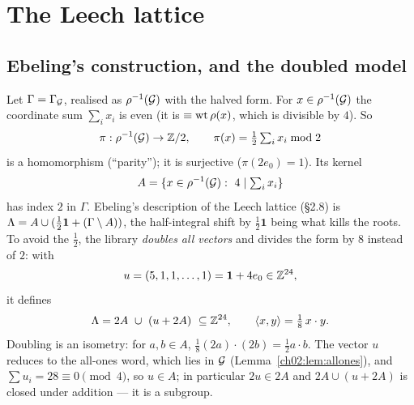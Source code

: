 \section{The Leech lattice}\label{ch02:sec:leech}

\subsection{Ebeling's construction, and the doubled model}

Let $\Gamma=\Gamma_{\mathcal{G}}$, realised as $\rho^{-1}(\mathcal{G})$ with the halved form.  For
$x\in\rho^{-1}(\mathcal{G})$ the coordinate sum $\sum_ix_i$ is even (it is $\equiv\operatorname{wt}\rho(x)$,
which is divisible by $4$).  So
\begin{equation*}
\pi:\rho^{-1}(\mathcal{G})\to{\mathbb{Z}}/2,\qquad \pi(x)=\tfrac12\textstyle\sum_ix_i\bmod2
\end{equation*}
is a homomorphism (``parity''); it is surjective ($\pi(2e_0)=1$).  Its kernel
\begin{equation*}
A=\{x\in\rho^{-1}(\chtwoG):\ 4\mid\textstyle\sum_ix_i\}
\end{equation*}
has index $2$ in $\Gamma$.  Ebeling's description of the Leech lattice (\S2.8) is
${\Lambda}=A\cup(\tfrac12\mathbf 1+(\Gamma\setminus A))$, the half-integral shift by $\tfrac12\mathbf
1$ being what kills the roots.  To avoid the $\tfrac12$, the library \emph{doubles all vectors}
and divides the form by $8$ instead of $2$: with
\begin{equation*}
u=(5,1,1,\dots,1)=\mathbf 1+4e_0\in{\mathbb{Z}}^{24},
\end{equation*}
it defines
\begin{equation}\label{ch02:eq:leech}
{\Lambda}=2A\ \cup\ (u+2A)\ \subseteq{\mathbb{Z}}^{24},\qquad \langle x,y\rangle=\tfrac18\,x\cdot y .
\end{equation}
Doubling is an isometry: for $a,b\in A$, $\tfrac18(2a)\cdot(2b)=\tfrac12a\cdot b$.  The vector
$u$ reduces to the all-ones word, which lies in $\mathcal{G}$ (Lemma~\ref{ch02:lem:allones}), and
$\sum u_i=28\equiv0\pmod4$, so $u\in A$; in particular $2u\in2A$ and $2A\cup(u+2A)$ is closed
under addition --- it is a subgroup.

